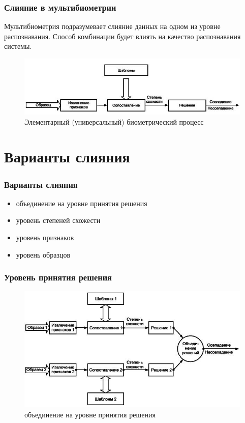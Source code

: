 \documentclass{beamer}
\begin{document}
\begin{frame}
\frametitle{Слияние в мультибиометрии}

Мультибиометрия подразумевает слияние данных на одном из уровне распознавания. 
Способ комбинации будет влиять на качество распознавания системы.

\begin{figure}[h!]
\centering
\includegraphics[scale=0.50]{res/bio_process}
\caption{Элементарный (универсальный) биометрический процесс}
\end{figure}


\end{frame}

\section{Варианты слияния}

\begin{frame}
\frametitle{Варианты слияния}

\begin{itemize}
\item объединение на уровне принятия решения
\item уровень степеней схожести
\item уровень признаков
\item уровень образцов
\end{itemize}

\end{frame}

\begin{frame}
\frametitle{Уровень принятия решения}

\begin{figure}[h!]
\centering
\includegraphics[scale=0.50]{res/bio_a}
\caption{объединение на уровне принятия решения}
\end{figure}

\end{frame}
\end{document}
